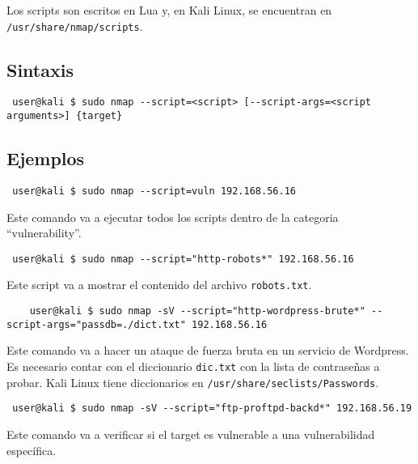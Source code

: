 \documentclass{article}
\begin{document}
Los scripts son escritos en Lua y, en Kali Linux, se encuentran en \texttt{/usr/share/nmap/scripts}.\\

\subsection{Sintaxis}

\begin{lstlisting}
 user@kali $ sudo nmap --script=<script> [--script-args=<script arguments>] {target}
\end{lstlisting}

\subsection{Ejemplos}

\begin{lstlisting}
 user@kali $ sudo nmap --script=vuln 192.168.56.16
\end{lstlisting}

Este comando va a ejecutar todos los scripts dentro de la categoria ``vulnerability''.\\

\begin{lstlisting}
 user@kali $ sudo nmap --script="http-robots*" 192.168.56.16
\end{lstlisting}

Este script va a mostrar el contenido del archivo \texttt{robots.txt}.\\

\begin{lstlisting}
    user@kali $ sudo nmap -sV --script="http-wordpress-brute*" --script-args="passdb=./dict.txt" 192.168.56.16
   \end{lstlisting}
   
   Este comando va a hacer un ataque de fuerza bruta en un servicio de Wordpress. Es necesario contar con el diccionario \texttt{dic.txt} con la lista de contrase\~nas a probar. Kali Linux tiene diccionarios en \texttt{/usr/share/seclists/Passwords}.\\   

\begin{lstlisting}
 user@kali $ sudo nmap -sV --script="ftp-proftpd-backd*" 192.168.56.19
\end{lstlisting}

Este comando va a verificar si el target es vulnerable a una vulnerabilidad espec\'ifica.\\
\end{document}
